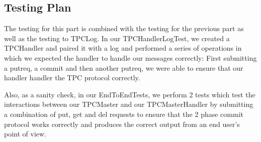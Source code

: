 \documentclass{article}
\begin{document}
\subsection*{Testing Plan}

The testing for this part is combined with the testing for the previous part as well as the testing to TPCLog.
In our TPCHandlerLogTest, we created a TPCHandler and paired it with a log and performed a series of operations in which we expected
the handler to handle our messages correctly: First submitting a putreq, a commit and then another putreq, we were able to ensure that our handler
handler the TPC protocol correctly.

Also, as a sanity check, in our EndToEndTests, we perform 2 tests which test the interactions between our TPCMaster and our TPCMasterHandler by
submitting a combination of put, get and del requests to ensure that the 2 phase commit protocol works correctly and produces the correct output
from an end user's point of view.
\end{document}
